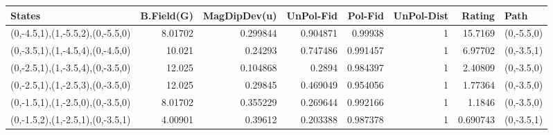 \begin{tabular}{lrrrrrrl}
\hline
 States                           &   B.Field(G) &   MagDipDev(u) &   UnPol-Fid &   Pol-Fid &   UnPol-Dist &    Rating & Path       \\
\hline
 (0,-4.5,1),(1,-5.5,2),(0,-5.5,0) &      8.01702 &       0.299844 &    0.904871 &  0.99938  &            1 & 15.7169   & (0,-5.5,0) \\
 (0,-3.5,1),(1,-4.5,4),(0,-4.5,0) &     10.021   &       0.24293  &    0.747486 &  0.991457 &            1 &  6.97702  & (0,-3.5,1) \\
 (0,-2.5,1),(1,-3.5,4),(0,-3.5,0) &     12.025   &       0.104868 &    0.2894   &  0.984397 &            1 &  2.40809  & (0,-3.5,0) \\
 (0,-2.5,1),(1,-2.5,3),(0,-3.5,0) &     12.025   &       0.29845  &    0.469049 &  0.954056 &            1 &  1.77364  & (0,-3.5,0) \\
 (0,-1.5,1),(1,-2.5,0),(0,-3.5,0) &      8.01702 &       0.355229 &    0.269644 &  0.992166 &            1 &  1.1846   & (0,-3.5,0) \\
 (0,-1.5,2),(1,-2.5,1),(0,-3.5,1) &      4.00901 &       0.39612  &    0.203388 &  0.987378 &            1 &  0.690743 & (0,-3.5,1) \\
\hline
\end{tabular}